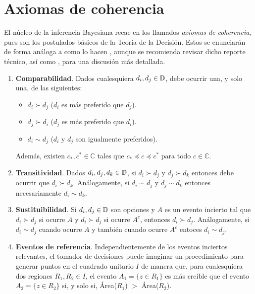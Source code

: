 \section{Axiomas de coherencia}

El núcleo de la inferencia Bayesiana recae en los llamados \textit{axiomas de coherencia}, pues son los postulados básicos de la Teoría de la Decisión. Estos se enunciarán de forma análoga a como lo hacen \citet[Capítulo~3.1]{notas_bayes}, aunque se recomienda revisar dicho reporte técnico, así como \citet[Capítulo~2.3]{bernardo_smith}, para una discusión más detallada.

\begin{enumerate}
\item \textbf{Comparabilidad}. Dados cualesquiera $d_i, d_j \in \mathbb{D}$, debe ocurrir una, y solo una, de las siguientes:
	\begin{itemize}
	\item $d_i \succ d_j$ ($d_i$ es más preferido que $d_j$).
    \item $d_j \succ d_i$ ($d_j$ es más preferido que $d_i$).
    \item$d_i \sim d_j$ ($d_i$ y $d_j$ son igualmente preferidos).
	\end{itemize}
Además, existen $c_{*}, c^{*} \in \mathbb{C}$ tales que $c_{*} \preceq c \preceq c^{*}$ para todo $c \in \mathbb{C}$.

\item \textbf{Transitividad}. Dados $d_i, d_j, d_k \in \mathbb{D}$, si $d_i \succ d_j$ y $d_j \succ d_k$ entonces debe ocurrir que $d_i \succ d_k$. Análogamente, si $d_i \sim d_j$ y $d_j \sim d_k$ entonces necesariamente $d_i \sim d_k$.

\item \textbf{Sustituibilidad}. Si $d_i, d_j \in \mathbb{D}$ son opciones y $A$ es un evento incierto tal que $d_i \succ d_j$ si ocurre $A$ y $d_i \succ d_j$ si ocurre $A^c$, entonces $d_i \succ d_j$. Análogamente, si $d_i \sim d_j$ cuando ocurre $A$ y también cuando ocurre $A^c$ entoces $d_i \sim d_j$.

\item \textbf{Eventos de referencia}. Independientemente de los eventos inciertos
relevantes, el tomador de decisiones puede imaginar un procedimiento para
generar puntos en el cuadrado unitario $I$ de manera que, para cualesquiera dos regiones $R_1, R_2 \in I$, el evento $A_1 = \{ z \in R_1 \}$ es más creíble que el evento $A_2 = \{ z \in R_2 \}$ si, y solo si, Área($R_1$) $>$ Área($R_2$).
\end{enumerate}

